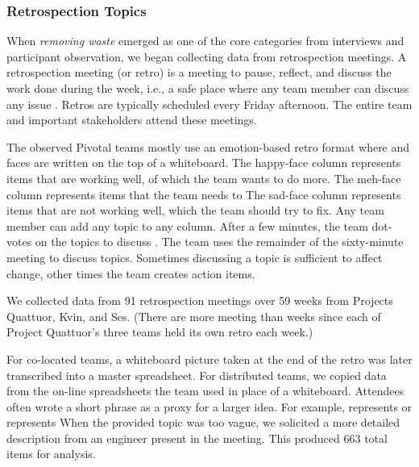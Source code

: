 \subsubsection{Retrospection Topics}
When \textit{removing waste} emerged as one of the core categories from interviews and participant observation, we began collecting data from retrospection meetings. A retrospection meeting (or retro) is a meeting to pause, reflect, and discuss the work done during the week, i.e., a safe place where any team member can discuss any issue \cite{DerbyAgileRetrospectives}. Retros are typically scheduled every Friday afternoon. The entire team and important stakeholders attend these meetings. 


The observed Pivotal teams mostly use an emotion-based retro format where   and  faces are written on the top of a whiteboard. The happy-face column represents items that are working well, of which the team wants to do more. The meh-face column represents  items that the team needs to  The sad-face column represents items that are not working well, which the team should try to fix. Any team member can add any topic to any column. After a few minutes, the team dot-votes on the topics to discuss \cite{DerbyAgileRetrospectives}. The team uses the remainder of the sixty-minute meeting to discuss topics. Sometimes discussing a topic is sufficient to affect change, other times the team creates action items. 


We collected data from 91 retrospection meetings over 59 weeks from Projects Quattuor, Kvin, and Ses. (There are more meeting than weeks since each of Project Quattuor's three teams held its own retro each week.)


For co-located teams, a whiteboard picture taken at the end of the retro was later transcribed into a master spreadsheet. For distributed teams, we copied data from the on-line spreadsheets the team used in place of a whiteboard. Attendees often wrote a short phrase as a proxy for a larger idea. For example,  represents  or  represents  When the provided topic was too vague, we solicited a more detailed description from an engineer present in the meeting. This produced 663 total items for analysis. 


